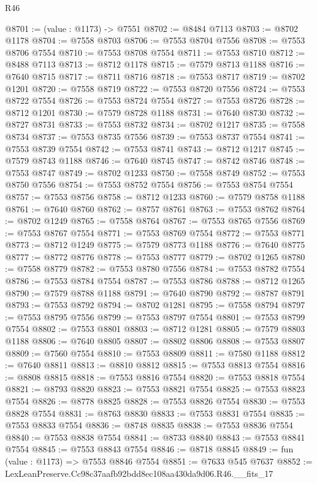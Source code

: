 \begin{lexlean}{R46}
\begin{coremodule}
@8701 := (value : @1173) -> @7551
@8702 := @8484 @7113
@8703 := @8702 @1178
@8704 := @7558 @8703
@8706 := @7553 @8704 @7556
@8708 := @7553 @8706 @7554
@8710 := @7553 @8708 @7554
@8711 := @7553 @8710
@8712 := @8488 @7113
@8713 := @8712 @1178
@8715 := @7579 @8713 @1188
@8716 := @7640 @8715
@8717 := @8711 @8716
@8718 := @7553 @8717
@8719 := @8702 @1201
@8720 := @7558 @8719
@8722 := @7553 @8720 @7556
@8724 := @7553 @8722 @7554
@8726 := @7553 @8724 @7554
@8727 := @7553 @8726
@8728 := @8712 @1201
@8730 := @7579 @8728 @1188
@8731 := @7640 @8730
@8732 := @8727 @8731
@8733 := @7553 @8732
@8734 := @8702 @1217
@8735 := @7558 @8734
@8737 := @7553 @8735 @7556
@8739 := @7553 @8737 @7554
@8741 := @7553 @8739 @7554
@8742 := @7553 @8741
@8743 := @8712 @1217
@8745 := @7579 @8743 @1188
@8746 := @7640 @8745
@8747 := @8742 @8746
@8748 := @7553 @8747
@8749 := @8702 @1233
@8750 := @7558 @8749
@8752 := @7553 @8750 @7556
@8754 := @7553 @8752 @7554
@8756 := @7553 @8754 @7554
@8757 := @7553 @8756
@8758 := @8712 @1233
@8760 := @7579 @8758 @1188
@8761 := @7640 @8760
@8762 := @8757 @8761
@8763 := @7553 @8762
@8764 := @8702 @1249
@8765 := @7558 @8764
@8767 := @7553 @8765 @7556
@8769 := @7553 @8767 @7554
@8771 := @7553 @8769 @7554
@8772 := @7553 @8771
@8773 := @8712 @1249
@8775 := @7579 @8773 @1188
@8776 := @7640 @8775
@8777 := @8772 @8776
@8778 := @7553 @8777
@8779 := @8702 @1265
@8780 := @7558 @8779
@8782 := @7553 @8780 @7556
@8784 := @7553 @8782 @7554
@8786 := @7553 @8784 @7554
@8787 := @7553 @8786
@8788 := @8712 @1265
@8790 := @7579 @8788 @1188
@8791 := @7640 @8790
@8792 := @8787 @8791
@8793 := @7553 @8792
@8794 := @8702 @1281
@8795 := @7558 @8794
@8797 := @7553 @8795 @7556
@8799 := @7553 @8797 @7554
@8801 := @7553 @8799 @7554
@8802 := @7553 @8801
@8803 := @8712 @1281
@8805 := @7579 @8803 @1188
@8806 := @7640 @8805
@8807 := @8802 @8806
@8808 := @7553 @8807
@8809 := @7560 @7554
@8810 := @7553 @8809
@8811 := @7580 @1188
@8812 := @7640 @8811
@8813 := @8810 @8812
@8815 := @7553 @8813 @7554
@8816 := @8808 @8815
@8818 := @7553 @8816 @7554
@8820 := @7553 @8818 @7554
@8821 := @8793 @8820
@8823 := @7553 @8821 @7554
@8825 := @7553 @8823 @7554
@8826 := @8778 @8825
@8828 := @7553 @8826 @7554
@8830 := @7553 @8828 @7554
@8831 := @8763 @8830
@8833 := @7553 @8831 @7554
@8835 := @7553 @8833 @7554
@8836 := @8748 @8835
@8838 := @7553 @8836 @7554
@8840 := @7553 @8838 @7554
@8841 := @8733 @8840
@8843 := @7553 @8841 @7554
@8845 := @7553 @8843 @7554
@8846 := @8718 @8845
@8849 := fun (value : @1173) => @7553 @8846 @7554
@8851 := @7633 @545 @7637
@8852 := LexLeanPreserve.Cc98c37aafb92bdd8ec108aa430da9d06.R46.__fits_17

\end{coremodule}
\end{lexlean}
